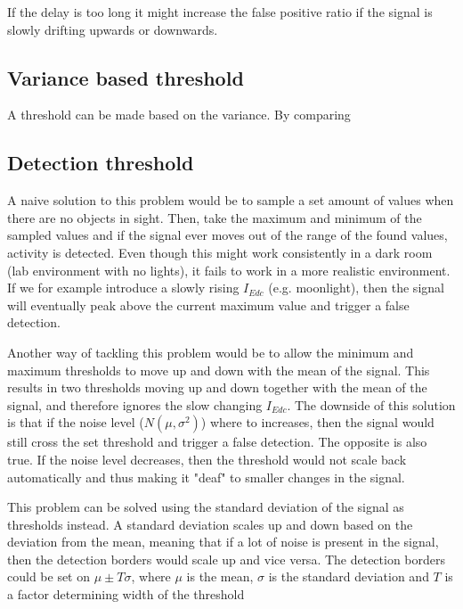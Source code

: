 If the delay is too long it might increase the false positive ratio if the signal is slowly drifting upwards or downwards.

\subsection{Variance based threshold}
A threshold can be made based on the variance. By comparing 






\subsection{Detection threshold}
A naive solution to this problem would be to sample a set amount of values when there are no objects in sight. Then, take the maximum and minimum of the sampled values and if the signal ever moves out of the range of the found values, activity is detected. Even though this might work consistently in a dark room (lab environment with no lights), it fails to work in a more realistic environment. If we for example introduce a slowly rising $I_{Edc}$ (e.g. moonlight), then the signal will eventually peak above the current maximum value and trigger a false detection.

Another way of tackling this problem would be to allow the minimum and maximum thresholds to move up and down with the mean of the signal. This results in two thresholds moving up and down together with the mean of the signal, and therefore ignores the slow changing $I_{Edc}$. The downside of this solution is that if the noise level ($N(\mu,\sigma^2)$) where to increases, then the signal would still cross the set threshold and trigger a false detection. The opposite is also true. If the noise level decreases, then the threshold would not scale back automatically and thus making it "deaf" to smaller changes in the signal.

This problem can be solved using the standard deviation of the signal as thresholds instead. A standard deviation scales up and down based on the deviation from the mean, meaning that if a lot of noise is present in the signal, then the detection borders would scale up and vice versa. The detection borders could be set on $\mu\pm T\sigma$, where $\mu$ is the mean, $\sigma$ is the standard deviation and $T$ is a factor determining width of the threshold

